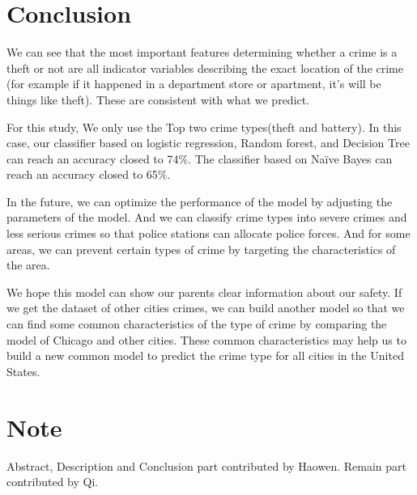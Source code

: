 \documentclass{article}
\begin{document}
\section{Conclusion}
We can see that the most important features determining whether a crime is a theft or not are all indicator variables describing the exact location of the crime (for example if it happened in a department store or apartment, it's will be things like theft). These are consistent with what we predict.

For this study, We only use the Top two crime types(theft and battery). In this case, our classifier based on logistic regression, Random forest, and Decision Tree can reach an accuracy closed to 74$\%$. The classifier based on Naïve Bayes can reach an accuracy closed to 65$\%$.

In the future, we can optimize the performance of the model by adjusting the parameters of the model. And we can classify crime types into severe crimes and less serious crimes so that police stations can allocate police forces. And for some areas, we can prevent certain types of crime by targeting the characteristics of the area. 

We hope this model can show our parents clear information about our safety. If we get the dataset of other cities crimes, we can build another model so that we can find some common characteristics of the type of crime by comparing the model of Chicago and other cities. These common characteristics may help us to build a new common model to predict the crime type for all cities in the United States.

\section{Note}
Abstract, Description and Conclusion part contributed by Haowen. Remain part contributed by Qi.




\end{document}
